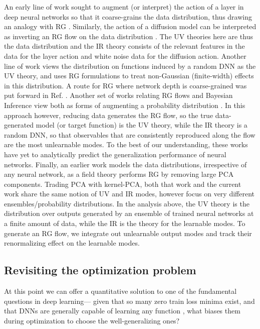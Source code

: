 An early line of work sought to augment (or interpret) the action of a layer in deep neural networks so that it coarse-grains the data distribution, thus drawing an analogy with RG \cite{mehta2014exact,Koch_Janusz_2018,Beny:2013pmv}. Similarly, the action of a diffusion model can be interpreted as inverting an RG flow on the data distribution \cite{Cotler_2023}. The UV theories here are thus the data distribution and the IR theory consists of the relevant features in the data for the layer action and white noise data for the diffusion action. Another line of work \cite{Erbin_2022,erbin2023functional} 
views the distribution on functions induced by a random DNN as the UV theory, and uses RG formulations to treat non-Gaussian (finite-width) effects \cite{Halverson:2020trp, Grosvenor:2021eol,Roberts_2022} 
in this distribution. A route for RG where network depth is coarse-grained was put forward in Ref. \cite{Lee2024DynamicNeurons}. 
Another set of works relating RG flows and Bayesian Inference view both as forms of augmenting a probability distribution  \cite{berman2022dynamics,berman2022inverse,Berman_2023,berman2024ncoder,howard2024bayesianrgflowneural}. In this approach however, reducing data generates the RG flow, so the true data-generated model (or target function) is the UV theory, while the  IR theory is a random DNN, so that observables that are consistently reproduced along the flow are the most unlearnable modes.
To the best of our understanding, these works have yet to analytically predict the generalization performance of neural networks. Finally, an earlier work \cite{Bradde_2017} models the data distributions, irrespective of any neural network, as a field theory performs RG by removing large PCA components. Trading PCA with kernel-PCA, both that work and the current work share the same notion of UV and IR modes, however focus on very different ensembles/probability distributions. In the analysis above, the UV theory is the distribution over outputs generated by an ensemble of trained neural networks at a finite amount of data, while the IR is the theory for the learnable modes. To generate an RG flow, we integrate out unlearnable output modes and track their renormalizing effect on the learnable modes.

\subsection{Revisiting the optimization problem}
At this point we can offer a quantitative solution to one of the fundamental questions in deep learning--- given that so many zero train loss minima exist, and that DNNs are generally capable of learning any function \citep{HORNIK1989,zhang2021understanding}, what biases them during optimization to choose the well-generalizing ones? 

